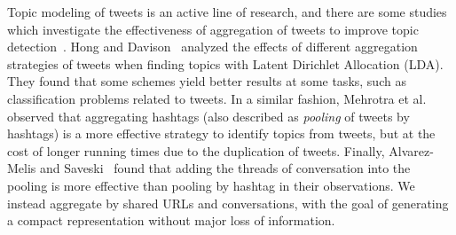 Topic modeling of tweets is an active line of research, and there are some
studies which investigate the effectiveness of aggregation of tweets to improve
topic
detection~\cite{Hong:2010:EST:1964858.1964870,Mehrotra:2013:ILT:2484028.2484166,alvarez2016topic}.
Hong and Davison~\cite{Hong:2010:EST:1964858.1964870} analyzed the effects of
different aggregation strategies of tweets when finding topics with Latent
Dirichlet Allocation (LDA). 
%
They found that some schemes yield better results at some tasks, such as
classification problems related to tweets. 
%
In a similar fashion, Mehrotra et al.~\cite{Mehrotra:2013:ILT:2484028.2484166}
observed that aggregating hashtags (also described as {\em pooling} of tweets by
hashtags) is a more effective strategy to identify topics from tweets, but at
the cost of longer running times due to the duplication of tweets. 
%
Finally, Alvarez-Melis and Saveski~\cite{alvarez2016topic} found that adding the
threads of conversation into the pooling is more effective than pooling by
hashtag in their observations. 
%
We instead aggregate by shared URLs and conversations, with the goal of
generating a compact representation without major loss of information.





